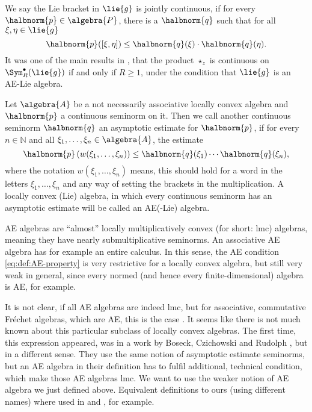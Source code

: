 \documentclass[
11pt,                          %
english                        %
]{article}
\begin{document}
We say the Lie bracket in $\lie{g}$ is jointly continuous, if for every 
$\halbnorm{p} \in \algebra{P}$, there is a $\halbnorm{q}$ such that for all $\xi, 
\eta \in \lie{g}$
\begin{equation}
	\label{eq:continuity-of-liebracket}
	\halbnorm{p}([\xi, \eta])
	\leq
	\halbnorm{q}(\xi) \cdot \halbnorm{q}(\eta).
\end{equation}
It was one of the main results in \cite{esposito.stapor.waldmann:2015a:pre}, that 
the product $\star_z$ is continuous on $\Sym_R^{\bullet}(\lie{g})$ if and only if 
$R \geq 1$, under the condition that $\lie{g}$ is an AE-Lie algebra.
\begin{definition}[AE-algebra]
	\label{def:AE-algebra}
	Let $\algebra{A}$ be a not necessarily associative locally convex algebra
	and $\halbnorm{p}$ a continuous seminorm on it. Then we call
	another continuous seminorm $\halbnorm{q}$ an asymptotic estimate for 
	$\halbnorm{p}$, if for every $n \in \mathbb{N}$ and all $\xi_1, \ldots, \xi_n
	\in \algebra{A}$, the estimate
	\begin{equation}
		\label{eq:def:AE-property}
		\halbnorm{p}\left(
			w(\xi_1, \ldots, \xi_n)
		\right)
		\leq
		\halbnorm{q}(\xi_1) \cdots \halbnorm{q}(\xi_n),
	\end{equation}
	where the notation $w(\xi_1, \ldots, \xi_n)$ means, this should hold for a word 
	in the letters $\xi_1, \ldots, \xi_n$ and any
	way of setting the brackets in the multiplication. A locally convex (Lie) 
	algebra, in which every continuous seminorm has an asymptotic estimate will be 
	called an AE(-Lie) algebra.
\end{definition}
AE algebras are ``almost'' locally multiplicatively convex (for short: lmc) 
algebras, meaning they have nearly submultiplicative seminorms. An associative AE 
algebra has for example an entire calculus. In this sense, the AE condition 
\eqref{eq:def:AE-property} is very restrictive for a locally convex algebra, but 
still very weak in general, since every normed (and hence every finite-dimensional) 
algebra is AE, for example.

It is not clear, if all AE algebras are indeed lmc, but for associative, commutative 
Fr\'echet algebras, which are AE, this is the case 
\cite{mitiagin.rolewicz.zelazko:1962a}. It seems like there is not much known about 
this particular subclass of locally convex algebras. The first time, this expression 
appeared, was in a work by Boseck, Czichowski and Rudolph 
\cite{boseck.czichowski.rudolph:1981a}, but in a different sense. They use the same 
notion of asymptotic estimate seminorms, but an AE algebra in their definition has to 
fulfil additional, technical condition, which make those AE algebras lmc. We want to 
use the weaker notion of AE algebra we just defined above. Equivalent definitions to 
ours (using different names) where used in \cite{gloeckner.neeb:2012a} and 
\cite{bogfjellmo.dahmen.schmedig:2015a}, for example.
\end{document}
